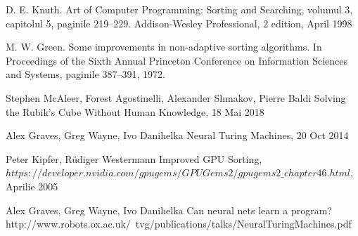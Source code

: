 \documentclass[12pt]{article}
\begin{document}
\begin{thebibliography}{12}
 D. E. Knuth. Art of Computer Programming: Sorting and Searching, volumul 3, capitolul 5, paginile
 219–229. Addison-Wesley Professional, 2 edition, April 1998

 M. W. Green. Some improvements in non-adaptive sorting algorithms. In Proceedings of the Sixth
 Annual Princeton Conference on Information Sciences and Systems, paginile 387–391, 1972.

 Stephen McAleer, Forest Agostinelli, Alexander Shmakov, Pierre Baldi
 Solving the Rubik's Cube Without Human Knowledge, 18 Mai 2018

 Alex Graves, Greg Wayne, Ivo Danihelka
 Neural Turing Machines, 20 Oct 2014
 
 \newblock Peter Kipfer, Rüdiger Westermann
 \newblock Improved GPU Sorting,
 \newblock $https://developer.nvidia.com/gpugems/GPUGems2/gpugems2\_chapter46.html$, Aprilie 2005
 
 \newblock Alex Graves, Greg Wayne, Ivo Danihelka
 \newblock Can neural nets learn a program?
 \newblock http://www.robots.ox.ac.uk/~tvg/publications/talks/NeuralTuringMachines.pdf

\end{thebibliography}
\end{document}
